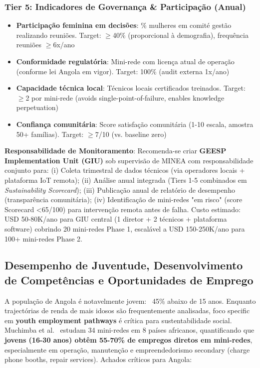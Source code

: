 \documentclass[12pt, a4paper]{article}
\begin{document}
{{{{{{{{{{{{\subsubsection{Tier 5: Indicadores de Governança & Participação (Anual)}
\begin{itemize}
\item \textbf{Participação feminina em decisões}: \% mulheres em comité gestão realizando reuniões. Target: $\geq$40\% (proporcional à demografia), frequência reuniões $\geq$6x/ano
\item \textbf{Conformidade regulatória}: Mini-rede com licença atual de operação (conforme lei Angola em vigor). Target: 100\% (audit externa 1x/ano)
\item \textbf{Capacidade técnica local}: Técnicos locais certificados treinados. Target: $\geq$2 por mini-rede (avoids single-point-of-failure, enables knowledge perpetuation)
\item \textbf{Confiança comunitária}: Score satisfação comunitária (1-10 escala, amostra 50+ famílias). Target: $\geq$7/10 (vs. baseline zero)
\end{itemize}

\textbf{Responsabilidade de Monitoramento}: Recomenda-se criar \textbf{GEESP Implementation Unit (GIU)} sob supervisão de MINEA com responsabilidade conjunto para: (i) Coleta trimestral de dados técnicos (via operadores locais + plataforma IoT remota); (ii) Análise anual integrada (Tiers 1-5 combinados em \textit{Sustainability Scorecard}); (iii) Publicação anual de relatório de desempenho (transparência comunitária); (iv) Identificação de mini-redes "em risco" (score Scorecard <65/100) para intervenção remota antes de falha. Custo estimado: USD 50-80K/ano para GIU central (1 diretor + 2 técnicos + plataforma software) cobrindo 20 mini-redes Phase 1, escalável a USD 150-250K/ano para 100+ mini-redes Phase 2.

\subsection{Desempenho de Juventude, Desenvolvimento de Competências e Oportunidades de Emprego}

A população de Angola é notavelmente jovem: ~45\% abaixo de 15 anos. Enquanto trajectórias de renda de mais idosos são frequentemente analisadas, foco specific em \textbf{youth employment pathways} é crítica para sustentabilidade social. Muchimba et al.~\citep{Muchimba2025} estudam 34 mini-redes em 8 países africanos, quantificando que \textbf{jovens (16-30 anos) obtêm 55-70\% de empregos diretos em mini-redes}, especialmente em operação, manutenção e empreendedorismo secondary (charge phone booths, repair services). Achados críticos para Angola:

}}}}}}}}}}}}
\end{document}

